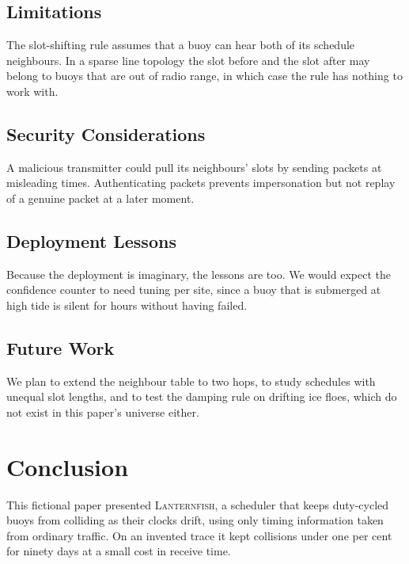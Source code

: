 \documentclass[conference]{IEEEtran}
\newcommand{\sysname}{\textsc{Lanternfish}}
\begin{document}
\subsection{Limitations}
\label{sec:disc-limits}

The slot-shifting rule assumes that a buoy can hear both of its schedule
neighbours. In a sparse line topology the slot before and the slot after may
belong to buoys that are out of radio range, in which case the rule has nothing
to work with.

\subsection{Security Considerations}
\label{sec:disc-security}

A malicious transmitter could pull its neighbours' slots by sending packets at
misleading times. Authenticating packets prevents impersonation but not replay
of a genuine packet at a later moment.

\subsection{Deployment Lessons}
\label{sec:disc-lessons}

Because the deployment is imaginary, the lessons are too. We would expect the
confidence counter to need tuning per site, since a buoy that is submerged at
high tide is silent for hours without having failed.

\subsection{Future Work}
\label{sec:disc-future}

We plan to extend the neighbour table to two hops, to study schedules with
unequal slot lengths, and to test the damping rule on drifting ice floes, which
do not exist in this paper's universe either.

\section{Conclusion}
\label{sec:conclusion}

This fictional paper presented \sysname, a scheduler that keeps duty-cycled
buoys from colliding as their clocks drift, using only timing information taken
from ordinary traffic. On an invented trace it kept collisions under one per
cent for ninety days at a small cost in receive time.
\end{document}
